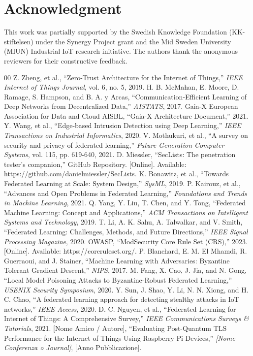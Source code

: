 \documentclass[conference]{IEEEtran}
\begin{document}
\section*{Acknowledgment}
This work was partially supported by the Swedish Knowledge Foundation (KK-stiftelsen) under the Synergy Project grant and the Mid Sweden University (MIUN) Industrial IoT research initiative. The authors thank the anonymous reviewers for their constructive feedback.

\begin{thebibliography}{00}
 Z. Zheng, et al., ``Zero-Trust Architecture for the Internet of Things,'' \textit{IEEE Internet of Things Journal}, vol. 6, no. 5, 2019.
 H. B. McMahan, E. Moore, D. Ramage, S. Hampson, and B. A. y Arcas, ``Communication-Efficient Learning of Deep Networks from Decentralized Data,'' \textit{AISTATS}, 2017.
 Gaia-X European Association for Data and Cloud AISBL, ``Gaia-X Architecture Document,'' 2021.
 Y. Wang, et al., ``Edge-based Intrusion Detection using Deep Learning,'' \textit{IEEE Transactions on Industrial Informatics}, 2020.
 V. Mothukuri, et al., ``A survey on security and privacy of federated learning,'' \textit{Future Generation Computer Systems}, vol. 115, pp. 619-640, 2021.
 D. Miessler, ``SecLists: The penetration tester's companion,'' GitHub Repository. [Online]. Available: https://github.com/danielmiessler/SecLists.
 K. Bonawitz, et al., ``Towards Federated Learning at Scale: System Design,'' \textit{SysML}, 2019.
 P. Kairouz, et al., ``Advances and Open Problems in Federated Learning,'' \textit{Foundations and Trends in Machine Learning}, 2021.
 Q. Yang, Y. Liu, T. Chen, and Y. Tong, ``Federated Machine Learning: Concept and Applications,'' \textit{ACM Transactions on Intelligent Systems and Technology}, 2019.
 T. Li, A. K. Sahu, A. Talwalkar, and V. Smith, ``Federated Learning: Challenges, Methods, and Future Directions,'' \textit{IEEE Signal Processing Magazine}, 2020.
 OWASP, ``ModSecurity Core Rule Set (CRS),'' 2023. [Online]. Available: https://coreruleset.org/.
 P. Blanchard, E. M. El Mhamdi, R. Guerraoui, and J. Stainer, ``Machine Learning with Adversaries: Byzantine Tolerant Gradient Descent,'' \textit{NIPS}, 2017.
 M. Fang, X. Cao, J. Jia, and N. Gong, ``Local Model Poisoning Attacks to Byzantine-Robust Federated Learning,'' \textit{USENIX Security Symposium}, 2020.
 Y. Sun, J. Shao, Y. Li, N. N. Xiong, and H. C. Chao, ``A federated learning approach for detecting stealthy attacks in IoT networks,'' \textit{IEEE Access}, 2020.
 D. C. Nguyen, et al., ``Federated Learning for Internet of Things: A Comprehensive Survey,'' \textit{IEEE Communications Surveys \& Tutorials}, 2021.
 [Nome Amico / Autore], ``Evaluating Post-Quantum TLS Performance for the Internet of Things Using Raspberry Pi Devices,'' \textit{[Nome Conferenza o Journal]}, [Anno Pubblicazione].
\end{thebibliography}
\end{document}

